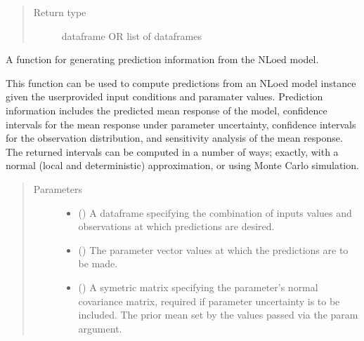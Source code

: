 \documentclass[letterpaper,10pt,english,openany,oneside]{sphinxmanual}
\begin{document}
\begin{fulllineitems}
\begin{fulllineitems}
\begin{quote}
\begin{description}
\item[{Return type}] \leavevmode
dataframe OR list of dataframes

\end{description}\end{quote}

\end{fulllineitems}


\begin{fulllineitems}
\label{\detokenize{nloed:nloed.model.Model.predict}}
A function for generating prediction information from the NLoed model.

This function can be used to compute predictions from an NLoed model instance given the
user\sphinxhyphen{}provided input conditions and paramater values. Prediction information includes the
predicted mean response of the model, confidence intervals for the mean response under
parameter uncertainty, confidence intervals for the observation distribution, and sensitivity
analysis of the mean response. The returned intervals can be computed in a number of ways;
exactly, with a normal (local and deterministic) approximation, or using Monte Carlo simulation.
\begin{quote}\begin{description}
\item[{Parameters}] \leavevmode\begin{itemize}
\item {} 
 () \textendash{} A dataframe specifying the combination of inputs values and
observations at which predictions are desired.

\item {} 
 (\sphinxstyleliteralemphasis{\sphinxupquote{, }}) \textendash{} The parameter vector values at which the predictions are to be made.

\item {} 
 (\sphinxstyleliteralemphasis{\sphinxupquote{, }}\sphinxstyleliteralemphasis{\sphinxupquote{, }}) \textendash{} A symetric matrix specifying the parameter’s
normal covariance matrix, required if parameter uncertainty is to be included. The
prior mean set by the values passed via the param argument.


\end{itemize}
\end{description}
\end{quote}
\end{fulllineitems}
\end{fulllineitems}
\end{document}
